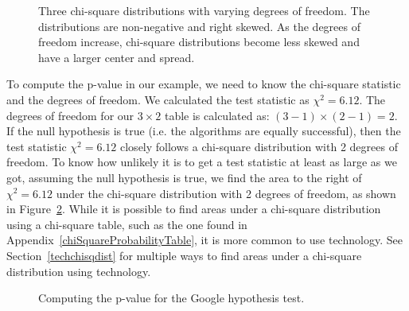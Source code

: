 \begin{figure}[h]
\centering
{}
\caption{Three chi-square distributions with varying degrees of freedom.  The distributions are non-negative and right skewed.  As the degrees of freedom increase, chi-square distributions become less skewed and have a larger center and spread.}
\label{chiSquareDistributionWithInceasingDF2}
\end{figure}


To compute the p-value in our example, we need to know the chi-square statistic and the degrees of freedom.  We calculated the test statistic as $\chi^2  = 6.12$.  The degrees of freedom for our $3\times 2$ table is calculated as: $(3-1)\times(2-1)= 2$.  If the null hypothesis is true (i.e. the algorithms are equally successful), then the test statistic $\chi^2 = 6.12$ closely follows a chi-square distribution with 2 degrees of freedom.  To know how unlikely it is to get a test statistic at least as large as we got, assuming the null hypothesis is true, we find the area to the right of $\chi^2 = 6.12$ under the chi-square distribution with 2 degrees of freedom, as shown in Figure~\ref{googleHTForDiffAlgPerformancePValue}.  While it is possible to find areas under a chi-square distribution using a chi-square table, such as the one found in Appendix~\vref{chiSquareProbabilityTable}, it is more common to use technology.  See Section~\ref{techchisqdist} for multiple ways to find areas under a chi-square distribution using technology.

\begin{figure}[h]
\centering
{}
\caption{Computing the p-value for the Google hypothesis test.}
\label{googleHTForDiffAlgPerformancePValue}
\end{figure}



